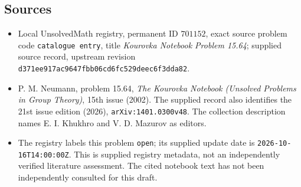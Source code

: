 \documentclass[11pt]{article}
\begin{document}
\subsection{Sources}
\begin{itemize}
\item Local UnsolvedMath registry, permanent ID \(701152\), exact source problem code \texttt{catalogue entry}, title \emph{Kourovka Notebook Problem 15.64}; supplied source record, upstream revision \texttt{d371ee917ac9647fbb06cd6fc529deec6f3dda82}.
\item P. M. Neumann, problem 15.64, \emph{The Kourovka Notebook (Unsolved Problems in Group Theory)}, 15th issue (2002). The supplied record also identifies the 21st issue edition (2026), \texttt{arXiv:1401.0300v48}. The collection description names E. I. Khukhro and V. D. Mazurov as editors.
\item The registry labels this problem \texttt{open}; its supplied update date is \texttt{2026-10-16T14:00:00Z}. This is supplied registry metadata, not an independently verified literature assessment. The cited notebook text has not been independently consulted for this draft.
\end{itemize}
\end{document}
